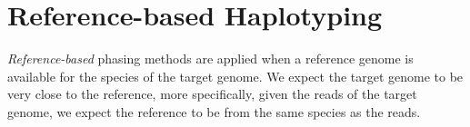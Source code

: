 


\section{Reference-based Haplotyping}\label{sec:ref}
\textit{Reference-based} phasing methods are applied when a reference genome is available for the species of the target genome.
We expect the target genome to be very close to the reference, more specifically, given the reads of the target genome, we expect the reference to be from the same species as the reads.

